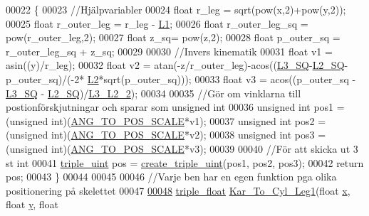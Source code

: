 \begin{DoxyCode}
00022 \{   
00023     \textcolor{comment}{//Hjälpvariabler}
00024     \textcolor{keywordtype}{float} r\_leg = sqrt(pow(x,2)+pow(y,2));
00025     \textcolor{keywordtype}{float} r\_outer\_leg = r\_leg - \hyperlink{invers__kinematik_8c_a1ce864b284ac751ffd8a0d98d5ccab55}{L1};
00026     \textcolor{keywordtype}{float} r\_outer\_leg\_sq = pow(r\_outer\_leg,2);
00027     \textcolor{keywordtype}{float} z\_sq= pow(z,2);
00028     \textcolor{keywordtype}{float} p\_outer\_sq =  r\_outer\_leg\_sq + z\_sq;
00029     
00030     \textcolor{comment}{//Invers kinematik}
00031     \textcolor{keywordtype}{float} v1 = asin((y)/r\_leg);
00032     \textcolor{keywordtype}{float} v2 = atan(-z/r\_outer\_leg)-acos((\hyperlink{invers__kinematik_8c_a0702a0cfbd3fd4cfd1e5d9e69d792ed7}{L3\_SQ}-\hyperlink{invers__kinematik_8c_a7a496732ef99aadddf8e1215ca9fbca7}{L2\_SQ}-p\_outer\_sq)/(-2*
      \hyperlink{invers__kinematik_8c_ab983f03862f557a786ccc43b26522e16}{L2}*sqrt(p\_outer\_sq)));
00033     \textcolor{keywordtype}{float} v3 = acos((p\_outer\_sq - \hyperlink{invers__kinematik_8c_a0702a0cfbd3fd4cfd1e5d9e69d792ed7}{L3\_SQ} - \hyperlink{invers__kinematik_8c_a7a496732ef99aadddf8e1215ca9fbca7}{L2\_SQ})/\hyperlink{invers__kinematik_8c_a36a1e67b0bf459531486e5d273b77f76}{L3\_L2\_2});
00034 
00035     \textcolor{comment}{//Gör om vinklarna till postionförskjutningar och sparar som unsigned int}
00036     \textcolor{keywordtype}{unsigned} \textcolor{keywordtype}{int} pos1 = (\textcolor{keywordtype}{unsigned} int)(\hyperlink{invers__kinematik_8c_a344b421f17a678e971ea980caf46ecae}{ANG\_TO\_POS\_SCALE}*v1);
00037     \textcolor{keywordtype}{unsigned} \textcolor{keywordtype}{int} pos2 = (\textcolor{keywordtype}{unsigned} int)(\hyperlink{invers__kinematik_8c_a344b421f17a678e971ea980caf46ecae}{ANG\_TO\_POS\_SCALE}*v2);
00038     \textcolor{keywordtype}{unsigned} \textcolor{keywordtype}{int} pos3 = (\textcolor{keywordtype}{unsigned} int)(\hyperlink{invers__kinematik_8c_a344b421f17a678e971ea980caf46ecae}{ANG\_TO\_POS\_SCALE}*v3);
00039     
00040     \textcolor{comment}{//För att skicka ut 3 st int}
00041     \hyperlink{structtriple__uint}{triple\_uint} pos = \hyperlink{structs_8c_a0bd229363859ac7df4e837cba6ad7ae4}{create\_triple\_uint}(pos1, pos2, pos3);
00042     \textcolor{keywordflow}{return} pos; 
00043 \}
00044 
00045 
00046 \textcolor{comment}{//Varje ben har en egen funktion pga olika positionering på skelettet}
00047 
\hypertarget{invers__kinematik_8c_source.tex_l00048}{}\hyperlink{invers__kinematik_8h_ae696af5df234c2f15694317bcf2a4bec}{00048} \hyperlink{structtriple__float}{triple\_float} \hyperlink{invers__kinematik_8c_ae696af5df234c2f15694317bcf2a4bec}{Kar\_To\_Cyl\_Leg1}(\textcolor{keywordtype}{float} \hyperlink{sensor_8h_a6c4b361d72eb3767ba424ac9a6ecf52b}{x}, \textcolor{keywordtype}{float} \hyperlink{sensor_8h_a0ed6a908288e0cd87f79c1b5ab56d07c}{y}, \textcolor{keywordtype}{float} 

\end{DoxyCode}
